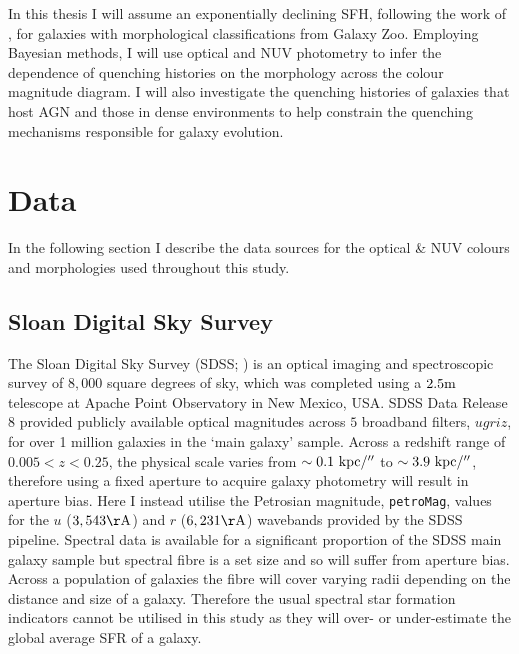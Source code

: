 In this thesis I will assume an exponentially declining SFH, following the work of \cite{schawinski14}, for galaxies with morphological classifications from Galaxy Zoo. Employing Bayesian methods, I will use optical and NUV photometry to infer the dependence of quenching histories on the morphology across the colour magnitude diagram. I will also investigate the quenching histories of galaxies that host AGN and those in dense environments to help constrain the quenching mechanisms responsible for galaxy evolution.

\section{Data}\label{sec:data}

In the following section I describe the data sources for the optical \& NUV colours and morphologies used throughout this study.

\subsection{Sloan Digital Sky Survey}\label{sec:sdssintro}

The Sloan Digital Sky Survey (SDSS; \citealt{york00}) is an optical imaging and spectroscopic survey of $8,000$ square degrees of sky, which was completed using a $2.5 \rm{m}$ telescope at Apache Point Observatory in New Mexico, USA. SDSS Data Release 8 \citep{aihara11} provided publicly available optical magnitudes across $5$ broadband filters, $ugriz$, for over 1 million galaxies in the `main galaxy' sample. {\minor Across a redshift range of $0.005 < z < 0.25$, the physical scale varies from $\sim0.1~\rm{kpc}/''$ to $\sim3.9~\rm{kpc}/''$, therefore using a fixed aperture to acquire galaxy photometry will result in aperture bias. Here I instead} utilise the Petrosian magnitude, {\tt petroMag}, values for the $u$ ($3,543 \rm{\AA}$) and $r$ ($6,231 \rm{\AA}$) wavebands provided by the SDSS pipeline. Spectral data is available for a significant proportion of the SDSS main galaxy sample but spectral fibre is a set size {\minor and so will suffer from aperture bias}. Across a population of galaxies the fibre will cover varying radii depending on the distance and size of a galaxy. Therefore the usual spectral star formation indicators cannot be utilised in this study as they will over- or under-estimate the global average SFR of a galaxy. 

